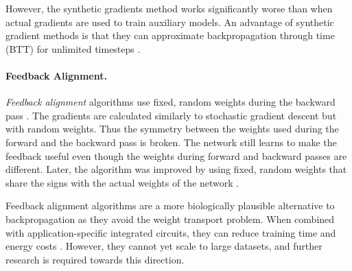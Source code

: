 However, the synthetic gradients method works significantly worse than when actual gradients are used to train auxiliary models.
An advantage of synthetic gradient methods is that they can approximate backpropagation through time (BTT) for unlimited timesteps \cite{jaderberg_decoupled_2017}.

\paragraph{Feedback Alignment.} \emph{Feedback alignment} algorithms use fixed, random weights during the backward pass .
The gradients are calculated similarly to stochastic gradient descent but with random weights.
Thus the symmetry between the weights used during the forward and the backward pass is broken.
The network still learns to make the feedback useful even though the weights during forward and backward passes are different. 
Later, the algorithm was improved by using fixed, random weights that share the signs with the actual weights of the network .

Feedback alignment algorithms are a more biologically plausible alternative to backpropagation as they avoid the weight transport problem.
When combined with  application-specific integrated circuits, they can reduce training time and energy costs \cite{lillicrap_random_2016}.
However, they cannot yet scale to large datasets, and further research is required towards this direction.

